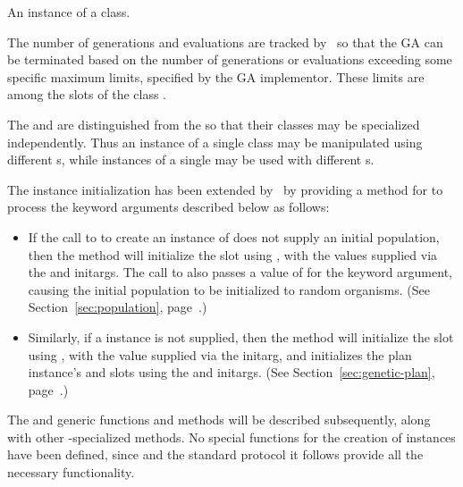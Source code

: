 {\samepage

  An instance of a  class.
\par}%
\gap

\filbreak

The number of generations and evaluations are tracked by \geco\ so that the 
GA can be terminated based on the number of generations or evaluations 
exceeding some specific maximum limits, specified by the GA implementor.  
These limits are among the slots of the class .

\filbreak
The  and  are distinguished from the 
 so that their classes may be specialized independently.  
Thus an instance of a single  class may be manipulated 
using different s, while instances of a single  may be 
used with different s.

\gap

\filbreak

{\samepage

The  instance initialization has been extended by \geco\ by providing
a  method for 
to process the keyword arguments described below as follows:
\begin{itemize}
	\item If the call to 
	to create an instance of  does not supply an initial population,
	then the  method will initialize the  slot using
	, with the values supplied via the  and
	 initargs.
	The call to  also passes a value of  for the 
	keyword argument, causing the initial population to be initialized to random organisms.
	(See Section~\ref{sec:population},
	page~\pageref{sec:population}.)
	
	\item Similarly, if a  instance is not supplied, then the 
	method will initialize the  slot using , with
	the value supplied via the  initarg, and initializes the plan
	instance's  and  slots using the
	 and  initargs. (See Section~\ref{sec:genetic-plan},
	page~\pageref{sec:genetic-plan}.)
\end{itemize}
The  and  generic functions and
methods will be described subsequently, along with other -specialized
methods.
No special functions for the creation of  instances have been defined,
since  and the standard  protocol it follows provide all
the necessary functionality.

\par}%

